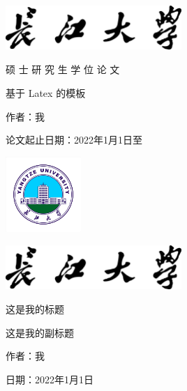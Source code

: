\documentclass[UTF8, 12pt, a4paper, oneside]{ctexart}
\begin{document}
\begin{titlepage}
    \centering
    \vspace*{5cm} %
    \includegraphics[height=1.69cm, width=6.68cm]{./figures/Yangtze_University.png}
    
    \vspace{1cm}
    {\Huge 硕 士 研 究 生 学 位 论 文}\par %
    \vspace{1cm} %
    {\Large 基于 Latex 的模板}\par %
    \vfill %
    {\Large 作者：我}\par %
    \vspace{0.5cm} %
    {\Large 论文起止日期：2022年1月1日至}\par %
\end{titlepage}

\begin{titlepage}
    \centering
    \vspace*{3cm} %
    \includegraphics[height=2.86cm,width=2.86cm]{./figures/Yangtze_University_logo.png}
    \par
    \includegraphics[height=1.69cm, width=6.68cm]{./figures/Yangtze_University.png}
    
    \vspace{1cm} %
    {\Huge 这是我的标题}\par %
    \vspace{1cm} %
    {\Large 这是我的副标题}\par %
    \vfill %
    {\Large 作者：我}\par %
    \vspace{0.5cm} %
    {\Large 日期：2022年1月1日}\par %
\end{titlepage}

\newpage %

\tableofcontents %
\newpage %

\newpage %

\newpage %

\newpage %

\end{document}
